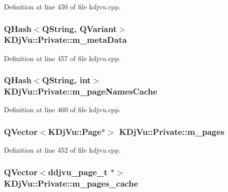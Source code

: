 Definition at line 450 of file kdjvu.\+cpp.

\hypertarget{classKDjVu_1_1Private_a48e70e9e1d6e964cacaf5bc8295dcba7}{
\subsubsection[{m\+\_\+meta\+Data}]{\setlength{\rightskip}{0pt plus 5cm}Q\+Hash$<$Q\+String, Q\+Variant$>$ K\+Dj\+Vu\+::\+Private\+::m\+\_\+meta\+Data}}\label{classKDjVu_1_1Private_a48e70e9e1d6e964cacaf5bc8295dcba7}


Definition at line 457 of file kdjvu.\+cpp.

\hypertarget{classKDjVu_1_1Private_ad9d14bf5618d9bd6fc6c0595f7122bf5}{
\subsubsection[{m\+\_\+page\+Names\+Cache}]{\setlength{\rightskip}{0pt plus 5cm}Q\+Hash$<$Q\+String, int$>$ K\+Dj\+Vu\+::\+Private\+::m\+\_\+page\+Names\+Cache}}\label{classKDjVu_1_1Private_ad9d14bf5618d9bd6fc6c0595f7122bf5}


Definition at line 460 of file kdjvu.\+cpp.

\hypertarget{classKDjVu_1_1Private_a0c009b87dde95717ec9e9a8f701e6628}{
\subsubsection[{m\+\_\+pages}]{\setlength{\rightskip}{0pt plus 5cm}Q\+Vector$<${\bf K\+Dj\+Vu\+::\+Page}$\ast$$>$ K\+Dj\+Vu\+::\+Private\+::m\+\_\+pages}}\label{classKDjVu_1_1Private_a0c009b87dde95717ec9e9a8f701e6628}


Definition at line 452 of file kdjvu.\+cpp.

\hypertarget{classKDjVu_1_1Private_a7c2361a6591fe13e69bc7982a3efd780}{
\subsubsection[{m\+\_\+pages\+\_\+cache}]{\setlength{\rightskip}{0pt plus 5cm}Q\+Vector$<$ddjvu\+\_\+page\+\_\+t $\ast$$>$ K\+Dj\+Vu\+::\+Private\+::m\+\_\+pages\+\_\+cache}}\label{classKDjVu_1_1Private_a7c2361a6591fe13e69bc7982a3efd780}


